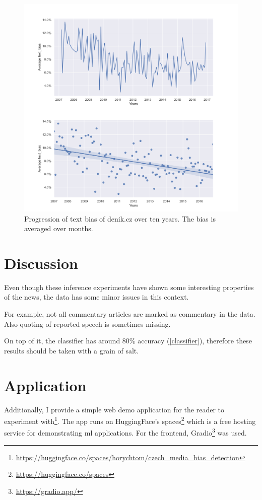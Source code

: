 \begin{figure}

  \includegraphics[scale=0.5]{my_modules/multimedia/inference/months_clean.jpg}
  \caption{Progression of text bias of denik.cz over ten years. The bias is averaged over months.}
  \label{fig:months_clean}
\end{figure}





\section{Discussion}
Even though these inference experiments have shown some interesting properties of the news, the data has some minor issues in this context. 

For example, not all commentary articles are marked as commentary in the data. Also quoting of reported speech is sometimes missing. 

On top of it, the classifier has around 80\% accuracy (\ref{classifier}), therefore these results should be taken with a grain of salt.




\section{Application}
Additionally, I provide a simple web demo application for the reader to experiment with\footnote{\url{https://huggingface.co/spaces/horychtom/czech_media_bias_detection}}. The app runs on HuggingFace's spaces\footnote{\url{https://huggingface.co/spaces}} which is a free hosting service for demonstrating \gls{ml} applications. For the frontend, Gradio\footnote{\url{https://gradio.app/}} was used.

